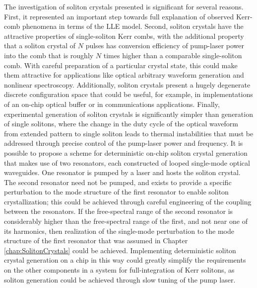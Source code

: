 The investigation of soliton crystals presented is significant for several reasons. First, it represented an important step towards full explanation of observed Kerr-comb phenomena in terms of the LLE model. Second, soliton crystals have the attractive properties of single-soliton Kerr combs, with the additional property that a soliton crystal of $N$ pulses has conversion efficiency of pump-laser power into the comb that is roughly $N$ times higher than a comparable single-soliton comb. With careful preparation of a particular crystal state, this could make them attractive for applications like optical arbitrary waveform generation and nonlinear spectroscopy. Additionally, soliton crystals present a hugely degenerate discrete configuration space that could be useful, for example, in implementations of an on-chip optical buffer \cite{Leo2010a} or in communications applications. Finally, experimental generation of soliton crystals is significantly simpler than generation of single solitons, where the change in the duty cycle of the optical waveform from extended pattern to single soliton leads to thermal instabilities that must be addressed through precise control of the pump-laser power and frequency. It is possible to propose a scheme for deterministic on-chip soliton crystal generation that makes use of two resonators, each constructed of looped single-mode optical waveguides. One resonator is pumped by a laser and hosts the soliton crystal. The second resonator need not be pumped, and exists to provide a specific perturbation to the mode structure of the first resonator to enable soliton crystallization; this could be achieved through careful engineering of the coupling between the resonators. If the free-spectral range of the second resonator is considerably higher than the free-spectral range of the first, and not near one of its harmonics, then realization of the single-mode perturbation to the mode structure of the first resonator that was assumed in Chapter \ref{chap:SolitonCrystals} could be achieved. Implementing deterministic soliton crystal generation on a chip in this way could greatly simplify the requirements on the other components in a system for full-integration of Kerr solitons, as soliton generation could be achieved through slow tuning of the pump laser.

